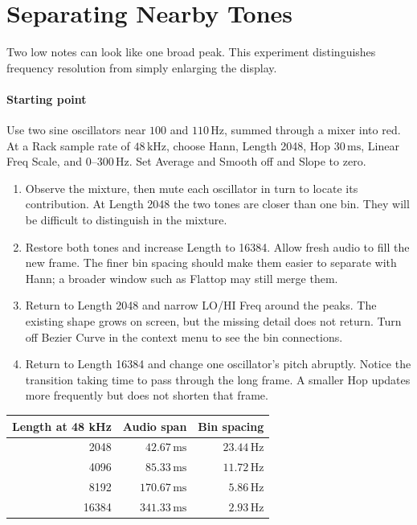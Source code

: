 \section{Separating Nearby Tones}\label{sec:resolution}

Two low notes can look like one broad peak. This experiment distinguishes
frequency resolution from simply enlarging the display.

\paragraph{Starting point}
Use two sine oscillators near $100$ and $110\,\mathrm{Hz}$, summed through
a mixer into red. At a Rack sample rate of $48\,\mathrm{kHz}$, choose Hann,
Length 2048, Hop $30\,\mathrm{ms}$, Linear Freq Scale, and
$0$--$300\,\mathrm{Hz}$. Set Average and Smooth off and Slope to zero.

\begin{enumerate}
  \item Observe the mixture, then mute each oscillator in turn to locate
  its contribution. At Length 2048 the two tones are closer than one bin.
  They will be difficult to distinguish in the mixture.
  \item Restore both tones and increase Length to 16384. Allow fresh audio
  to fill the new frame. The finer bin spacing should make them easier to
  separate with Hann; a broader window such as Flattop may still merge them.
  \item Return to Length 2048 and narrow LO/HI Freq around the peaks.
  The existing shape grows on screen, but the missing detail does not return.
  Turn off Bezier Curve in the context menu to see the bin connections.
  \item Return to Length 16384 and change one oscillator's pitch abruptly.
  Notice the transition taking time to pass through the long frame. A smaller
  Hop updates more frequently but does not shorten that frame.
\end{enumerate}

\begin{center}
\renewcommand{\arraystretch}{1.25}
\begin{tabular}{@{}rrr@{}}
\toprule
\textbf{Length at 48 kHz} & \textbf{Audio span} & \textbf{Bin spacing} \\
\midrule
2048 & $42.67\,\mathrm{ms}$ & $23.44\,\mathrm{Hz}$ \\
4096 & $85.33\,\mathrm{ms}$ & $11.72\,\mathrm{Hz}$ \\
8192 & $170.67\,\mathrm{ms}$ & $5.86\,\mathrm{Hz}$ \\
16384 & $341.33\,\mathrm{ms}$ & $2.93\,\mathrm{Hz}$ \\
\bottomrule
\end{tabular}
\end{center}

